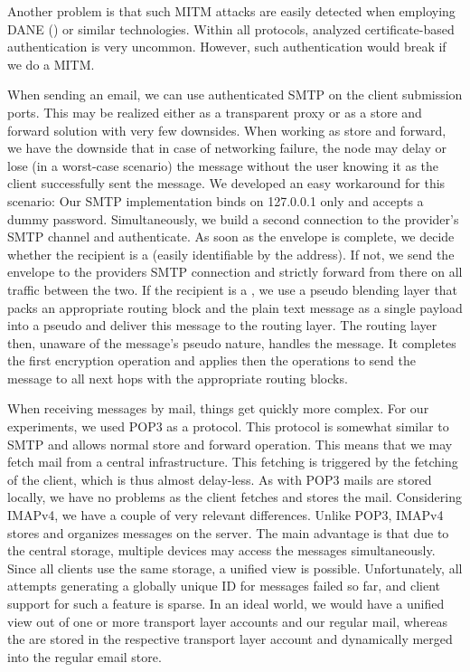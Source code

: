 Another problem is that such MITM attacks are easily detected when employing DANE (\cite{rfc6698,rfc7672}) or similar technologies. Within all protocols, analyzed certificate-based authentication is very uncommon. However, such authentication would break if we do a MITM.

When sending an email, we can use authenticated SMTP on the client submission ports. This may be realized either as a transparent proxy or as a store and forward solution with very few downsides. When working as store and forward, we have the downside that in case of networking failure, the node may delay or lose (in a worst-case scenario) the message without the user knowing it as the client successfully sent the message. We developed an easy workaround for this scenario: Our SMTP implementation binds on 127.0.0.1 only and accepts a dummy password. Simultaneously, we build a second connection to the provider's SMTP channel and authenticate. As soon as the envelope is complete, we decide whether the recipient is a \VortexNode{} (easily identifiable by the address). If not, we send the envelope to the providers SMTP connection and strictly forward from there on all traffic between the two. If the recipient is a \VortexNode{}, we use a pseudo blending layer that packs an appropriate routing block and the plain text message as a single payload into a pseudo \VortexMessage{} and deliver this message to the routing layer. The routing layer then, unaware of the message's pseudo nature, handles the message. It completes the first encryption operation and applies then the operations to send the message to all next hops with the appropriate routing blocks.

When receiving messages by mail, things get quickly more complex. For our experiments, we used POP3 as a protocol. This protocol is somewhat similar to SMTP and allows normal store and forward operation. This means that we may fetch mail from a central infrastructure. This fetching is triggered by the fetching of the client, which is thus almost delay-less. As with POP3 mails are stored locally, we have no problems as the client fetches and stores the mail. Considering IMAPv4, we have a couple of very relevant differences. Unlike POP3, IMAPv4 stores and organizes messages on the server. The main advantage is that due to the central storage, multiple devices may access the messages simultaneously. Since all clients use the same storage, a unified view is possible. Unfortunately, all attempts generating a globally unique ID for messages failed so far, and client support for such a feature is sparse. In an ideal world, we would have a unified view out of one or more \MessageVortex{} transport layer accounts and our regular mail, whereas the \VortexMessages{} are stored in the respective transport layer account and dynamically merged into the regular email store. 


